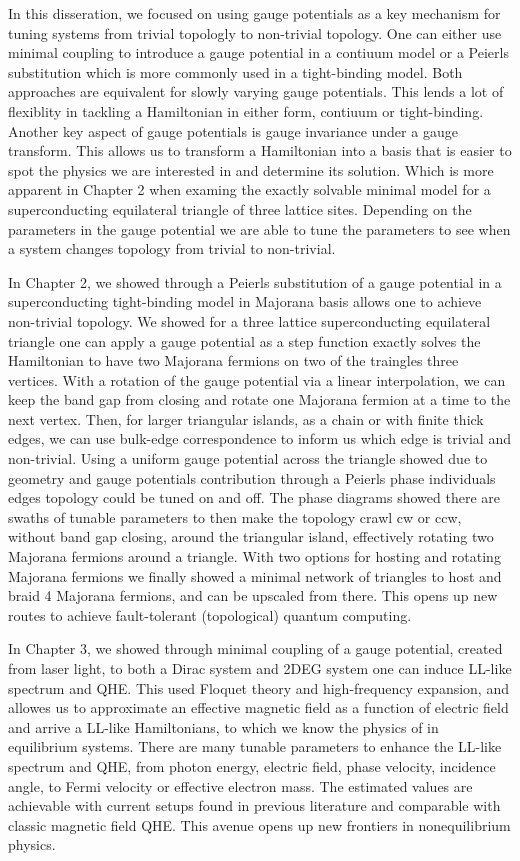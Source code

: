 In this disseration, we focused on using gauge potentials as a key mechanism for tuning systems from trivial topologly to non-trivial topology.
One can either use minimal coupling to introduce a gauge potential in a contiuum model or a Peierls substitution which is more commonly used in a tight-binding model.
Both approaches are equivalent for slowly varying gauge potentials.
This lends a lot of flexiblity in tackling a Hamiltonian in either form, contiuum or tight-binding.
Another key aspect of gauge potentials is gauge invariance under a gauge transform.
This allows us to transform a Hamiltonian into a basis that is easier to spot the physics we are interested in and determine its solution.
Which is more apparent in Chapter 2 when examing the exactly solvable minimal model for a superconducting equilateral triangle of three lattice sites.
Depending on the parameters in the gauge potential we are able to tune the parameters to see when a system changes topology from trivial to non-trivial.

In Chapter 2, we showed through a Peierls substitution of a gauge potential in a superconducting tight-binding model in Majorana basis allows one to achieve non-trivial topology.
We showed for a three lattice superconducting equilateral triangle one can apply a gauge potential as a step function exactly solves the Hamiltonian to have two Majorana fermions on two of the traingles three vertices.
With a rotation of the gauge potential via a linear interpolation, we can keep the band gap from closing and rotate one Majorana fermion at a time to the next vertex.
Then, for larger triangular islands, as a chain or with finite thick edges, we can use bulk-edge correspondence to inform us which edge is trivial and non-trivial.
Using a uniform gauge potential across the triangle showed due to geometry and gauge potentials contribution through a Peierls phase individuals edges topology could be tuned on and off.
The phase diagrams showed there are swaths of tunable parameters to then make the topology crawl cw or ccw, without band gap closing, around the triangular island, effectively rotating two Majorana fermions around a triangle.
With two options for hosting and rotating Majorana fermions we finally showed a minimal network of triangles to host and braid 4 Majorana fermions, and can be upscaled from there.
This opens up new routes to achieve fault-tolerant (topological) quantum computing.

In Chapter 3, we showed through minimal coupling of a gauge potential, created from laser light, to both a Dirac system and 2DEG system one can induce LL-like spectrum and QHE.
This used Floquet theory and high-frequency expansion, and allowes us to approximate an effective magnetic field as a function of electric field and arrive a LL-like Hamiltonians, to which we know the physics of in equilibrium systems.
There are many tunable parameters to enhance the LL-like spectrum and QHE, from photon energy, electric field, phase velocity, incidence angle, to Fermi velocity or effective electron mass.
The estimated values are achievable with current setups found in previous literature and comparable with classic magnetic field QHE.
This avenue opens up new frontiers in nonequilibrium physics.

